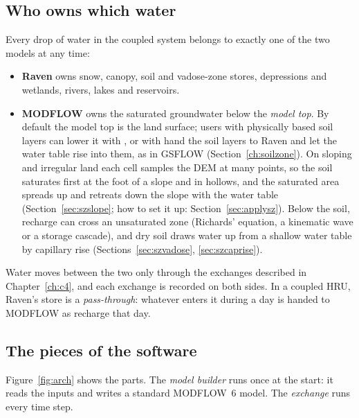 \subsection{Who owns which water}
Every drop of water in the coupled system belongs to exactly one of the two models at any time:
\begin{itemize}
\item \textbf{Raven} owns snow, canopy, soil and vadose-zone stores, depressions and wetlands, rivers, lakes and
reservoirs.
\item \textbf{MODFLOW} owns the saturated groundwater below the \emph{model top}. By default the model top is the land
surface; users with physically based soil layers can lower it with , or with
 hand the soil layers to Raven and let the water table rise into them, as in GSFLOW
\cite{markstrom2008gsflow} (Section~\ref{ch:soilzone}). On sloping and irregular land each cell samples the DEM at
many points, so the soil saturates first at the foot of a slope and in hollows, and the saturated area spreads up and
retreats down the slope with the water table (Section~\ref{sec:szslope}; how to set it up: Section~\ref{sec:applysz}).
Below the soil, recharge can cross an unsaturated zone (Richards' equation, a kinematic wave or a storage cascade), and
dry soil draws water up from a shallow water table by capillary rise (Sections~\ref{sec:szvadose}, \ref{sec:szcaprise}).
\end{itemize}
Water moves between the two only through the exchanges described in Chapter~\ref{ch:c4}, and each exchange is recorded on both
sides. In a coupled HRU, Raven's  store is a \emph{pass-through}: whatever enters it during a day is
handed to MODFLOW as recharge that day.

\subsection{The pieces of the software}
Figure~\ref{fig:arch} shows the parts. The \emph{model builder} runs once at the start: it reads the inputs and writes a
standard MODFLOW~6 model. The \emph{exchange} runs every time step.

